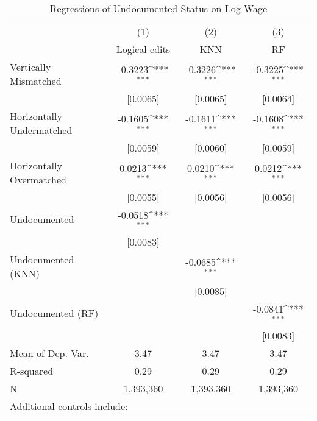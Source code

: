 \begin{table}[htbp]\centering
\def\sym#1{\ifmmode^{#1}\else\(^{#1}\)\fi}
\caption{Regressions of Undocumented Status on Log-Wage}
\begin{tabular}{l*{3}{c}}
\toprule
                    &\multicolumn{1}{c}{(1)}         &\multicolumn{1}{c}{(2)}         &\multicolumn{1}{c}{(3)}         \\
                    &Logical edits         &         KNN         &          RF         \\
\midrule
Vertically Mismatched&     -0.3223\sym{***}&     -0.3226\sym{***}&     -0.3225\sym{***}\\
                    &    [0.0065]         &    [0.0065]         &    [0.0064]         \\
\addlinespace
Horizontally Undermatched&     -0.1605\sym{***}&     -0.1611\sym{***}&     -0.1608\sym{***}\\
                    &    [0.0059]         &    [0.0060]         &    [0.0059]         \\
\addlinespace
Horizontally Overmatched&      0.0213\sym{***}&      0.0210\sym{***}&      0.0212\sym{***}\\
                    &    [0.0055]         &    [0.0056]         &    [0.0056]         \\
\addlinespace
Undocumented        &     -0.0518\sym{***}&                     &                     \\
                    &    [0.0083]         &                     &                     \\
\addlinespace
Undocumented (KNN)  &                     &     -0.0685\sym{***}&                     \\
                    &                     &    [0.0085]         &                     \\
\addlinespace
Undocumented (RF)   &                     &                     &     -0.0841\sym{***}\\
                    &                     &                     &    [0.0083]         \\
\midrule
Mean of Dep. Var.   &        3.47         &        3.47         &        3.47         \\
R-squared           &        0.29         &        0.29         &        0.29         \\
N                   &   1,393,360         &   1,393,360         &   1,393,360         \\
\bottomrule
\multicolumn{4}{l}{\footnotesize Additional controls include:}\\

\end{tabular}
\end{table}
